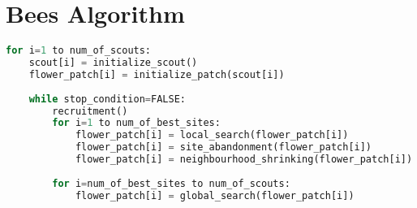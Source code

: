 \section{Bees Algorithm}

\begin{lstlisting}[language=Python, caption=Bees Algorithm (Pseudocode) {\cite{Wiki08}}]
for i=1 to num_of_scouts:
    scout[i] = initialize_scout()
    flower_patch[i] = initialize_patch(scout[i])
    
    while stop_condition=FALSE:
        recruitment()
        for i=1 to num_of_best_sites:
            flower_patch[i] = local_search(flower_patch[i])
            flower_patch[i] = site_abandonment(flower_patch[i])
            flower_patch[i] = neighbourhood_shrinking(flower_patch[i])
    
        for i=num_of_best_sites to num_of_scouts:
            flower_patch[i] = global_search(flower_patch[i])
\end{lstlisting}

\clearpage
\newpage
